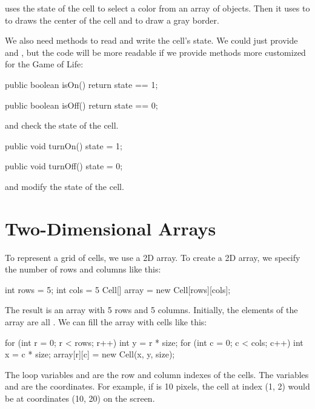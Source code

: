  uses the state of the cell to select a color from an array of  objects.
Then it uses to  to draws the center of the cell and  to draw a gray border.

We also need methods to read and write the cell's state.
We could just provide  and ,
but the code will be more readable if we provide methods more customized for the Game of Life:

\begin{code}
    public boolean isOn() {
        return state == 1;
    }

    public boolean isOff() {
        return state == 0;
    }
\end{code}

 and  check the state of the cell.

\begin{code}
    public void turnOn() {
        state = 1;
    }

    public void turnOff() {
        state = 0;
    }
\end{code}

 and  modify the state of the cell.


\section{Two-Dimensional Arrays}

To represent a grid of cells, we use a 2D array.
To create a 2D array, we specify the number of rows and columns like this:

\begin{code}
int rows = 5;
int cols = 5
Cell[] array = new Cell[rows][cols];
\end{code}

The result is an array with 5 rows and 5 columns.
Initially, the elements of the array are all .
We can fill the array with cells like this:

\begin{code}
for (int r = 0; r < rows; r++) {
    int y = r * size;
    for (int c = 0; c < cols; c++) {
        int x = c * size;
        array[r][c] = new Cell(x, y, size);
    }
}
\end{code}

The loop variables  and  are the row and column indexes of the cells.
The variables  and  are the coordinates.
For example, if  is 10 pixels, the cell at index (1, 2) would be at coordinates (10, 20) on the screen.

